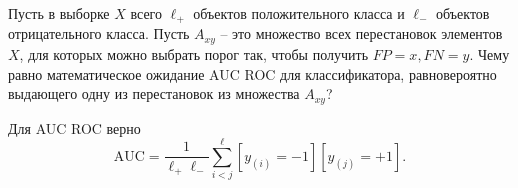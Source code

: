 \documentclass[12pt,a4paper]{article}
\begin{document}
\begin{vkProblem}
Пусть в выборке $X$ всего $\ell_{+}$ объектов положительного класса и $\ell_{-}$ объектов отрицательного класса.
Пусть $A_{xy}$ -- это множество всех перестановок элементов $X$, для которых можно выбрать порог так, чтобы получить $FP = x, FN = y.$ 
Чему равно математическое ожидание AUC ROC для классификатора, равновероятно выдающего одну из перестановок из множества $A_{xy}$?
\end{vkProblem}

\begin{esSolution}
Для AUC ROC верно
$$\text{AUC} = \frac{1}{\ell_{+} \ell_{-}} \sum_{i < j}^{\ell} [y_{(i)} = -1] [y_{(j)} = +1].$$


\end{esSolution}
\end{document}
